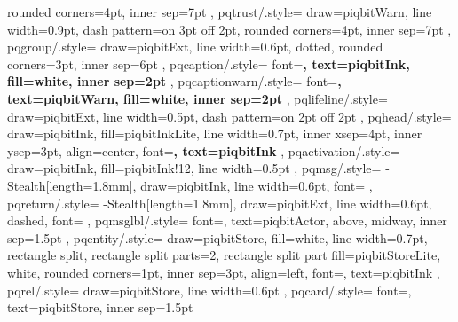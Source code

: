 {{    rounded corners=4pt, inner sep=7pt
  },
  pqtrust/.style={
    draw=piqbitWarn, line width=0.9pt, dash pattern=on 3pt off 2pt,
    rounded corners=4pt, inner sep=7pt
  },
  pqgroup/.style={
    draw=piqbitExt, line width=0.6pt, dotted,
    rounded corners=3pt, inner sep=6pt
  },
  pqcaption/.style={
    font=\scriptsize\bfseries, text=piqbitInk, fill=white, inner sep=2pt
  },
  pqcaptionwarn/.style={
    font=\scriptsize\bfseries, text=piqbitWarn, fill=white, inner sep=2pt
  },
  pqlifeline/.style={
    draw=piqbitExt, line width=0.5pt, dash pattern=on 2pt off 2pt
  },
  pqhead/.style={
    draw=piqbitInk, fill=piqbitInkLite, line width=0.7pt,
    inner xsep=4pt, inner ysep=3pt, align=center,
    font=\scriptsize\bfseries, text=piqbitInk
  },
  pqactivation/.style={
    draw=piqbitInk, fill=piqbitInk!12, line width=0.5pt
  },
  pqmsg/.style={
    -{Stealth[length=1.8mm]}, draw=piqbitInk, line width=0.6pt,
    font=\scriptsize
  },
  pqreturn/.style={
    -{Stealth[length=1.8mm]}, draw=piqbitExt, line width=0.6pt, dashed,
    font=\scriptsize
  },
  pqmsglbl/.style={
    font=\scriptsize, text=piqbitActor, above, midway, inner sep=1.5pt
  },
  pqentity/.style={
    draw=piqbitStore, fill=white, line width=0.7pt,
    rectangle split, rectangle split parts=2,
    rectangle split part fill={piqbitStoreLite, white},
    rounded corners=1pt, inner sep=3pt, align=left,
    font=\scriptsize, text=piqbitInk
  },
  pqrel/.style={
    draw=piqbitStore, line width=0.6pt
  },
  pqcard/.style={
    font=\tiny, text=piqbitStore, inner sep=1.5pt
  }
}
%
\newcommand{\pqlegend}[1]{%
  \par\smallskip\noindent{\scriptsize\textit{Légende — #1}}\par
}

